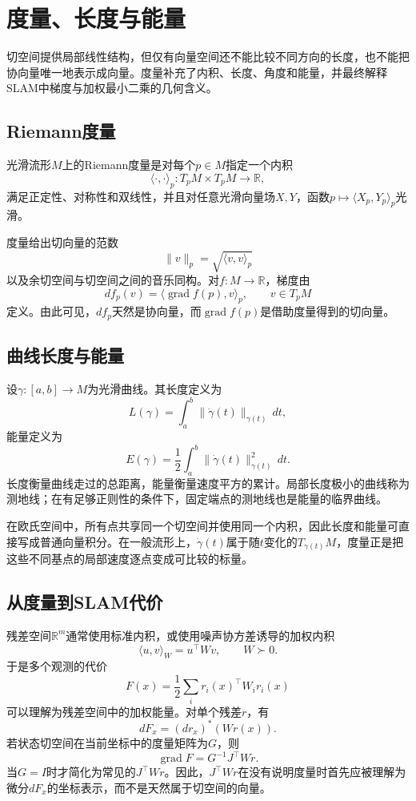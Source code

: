 
\section{度量、长度与能量}

切空间提供局部线性结构，但仅有向量空间还不能比较不同方向的长度，也不能把协向量唯一地表示成向量。度量补充了内积、长度、角度和能量，并最终解释SLAM中梯度与加权最小二乘的几何含义。

\subsection{Riemann度量}

\begin{definition}[Riemann度量]
光滑流形$M$上的Riemann度量是对每个$p\in M$指定一个内积
\[
    \langle\cdot,\cdot\rangle_p:T_pM\times T_pM\to\mathbb R,
\]
满足正定性、对称性和双线性，并且对任意光滑向量场$X,Y$，函数$p\mapsto\langle X_p,Y_p\rangle_p$光滑。
\end{definition}

度量给出切向量的范数
\[
    \|v\|_p=\sqrt{\langle v,v\rangle_p}
\]
以及余切空间与切空间之间的音乐同构。对$f:M\to\mathbb R$，梯度由
\[
    df_p(v)=\langle\operatorname{grad}f(p),v\rangle_p,
    \qquad v\in T_pM
\]
定义。由此可见，$df_p$天然是协向量，而$\operatorname{grad}f(p)$是借助度量得到的切向量。

\subsection{曲线长度与能量}

设$\gamma:[a,b]\to M$为光滑曲线。其长度定义为
\[
    L(\gamma)=\int_a^b\|\dot\gamma(t)\|_{\gamma(t)}\,dt,
\]
能量定义为
\[
    E(\gamma)=\frac12\int_a^b\|\dot\gamma(t)\|_{\gamma(t)}^2\,dt.
\]
长度衡量曲线走过的总距离，能量衡量速度平方的累计。局部长度极小的曲线称为测地线；在有足够正则性的条件下，固定端点的测地线也是能量的临界曲线。

在欧氏空间中，所有点共享同一个切空间并使用同一个内积，因此长度和能量可直接写成普通向量积分。在一般流形上，$\dot\gamma(t)$属于随$t$变化的$T_{\gamma(t)}M$，度量正是把这些不同基点的局部速度逐点变成可比较的标量。

\subsection{从度量到SLAM代价}

残差空间$\mathbb R^m$通常使用标准内积，或使用噪声协方差诱导的加权内积
\[
    \langle u,v\rangle_W=u^\top Wv,
    \qquad W\succ0.
\]
于是多个观测的代价
\[
    F(x)=\frac12\sum_i r_i(x)^\top W_i r_i(x)
\]
可以理解为残差空间中的加权能量。对单个残差$r$，有
\[
    dF_x=(dr_x)^\ast(Wr(x)).
\]
若状态切空间在当前坐标中的度量矩阵为$G$，则
\[
    \operatorname{grad}F
    =G^{-1}J^\top Wr.
\]
当$G=I$时才简化为常见的$J^\top Wr$。因此，$J^\top Wr$在没有说明度量时首先应被理解为微分$dF_x$的坐标表示，而不是天然属于切空间的向量。

